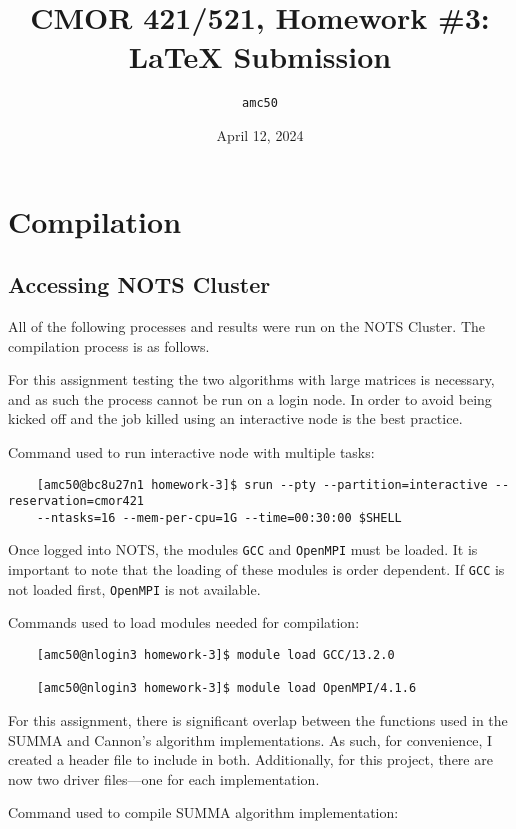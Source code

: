 \documentclass{article}
\title{CMOR 421/521, Homework \#3: \LaTeX{} Submission}
\author{\texttt{amc50}}
\date{April 12, 2024}
\begin{document}
\maketitle

\section{Compilation}
\subsection{Accessing NOTS Cluster}
All of the following processes and results were run on the NOTS Cluster. The compilation process is as follows. 

\bigskip
\noindent
For this assignment testing the two algorithms with large matrices is necessary, and as such the process cannot be run on a login node. In order to avoid being kicked off and the job killed using an interactive node is the best practice. 

\bigskip
\noindent 
Command used to run interactive node with multiple tasks:

\begin{verbatim}
    [amc50@bc8u27n1 homework-3]$ srun --pty --partition=interactive --reservation=cmor421 
    --ntasks=16 --mem-per-cpu=1G --time=00:30:00 $SHELL    
\end{verbatim}

\bigskip 
\noindent
Once logged into NOTS, the modules \texttt{GCC} and \texttt{OpenMPI} must be loaded. It is important to note that the loading of these modules is order dependent. If \texttt{GCC} is not loaded first, \texttt{OpenMPI} is not available.

\bigskip
\noindent 
Commands used to load modules needed for compilation:
\begin{verbatim}
    [amc50@nlogin3 homework-3]$ module load GCC/13.2.0

    [amc50@nlogin3 homework-3]$ module load OpenMPI/4.1.6 
\end{verbatim}

\bigskip
\noindent
For this assignment, there is significant overlap between the functions used in the SUMMA and Cannon's algorithm implementations. As such, for convenience, I created a header file to include in both. Additionally, for this project, there are now two driver files---one for each implementation.

\bigskip
\noindent
Command used to compile SUMMA algorithm implementation:
\end{document}
